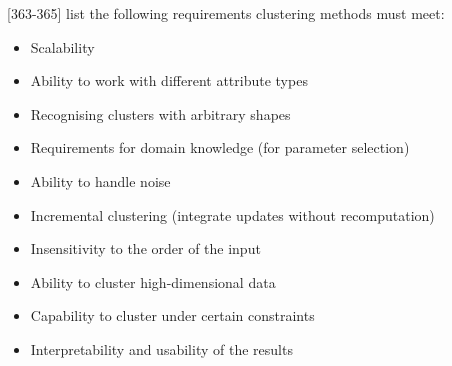 

\textcite{han2011data}[363-365] list the following requirements  clustering methods must meet:
\begin{itemize}
  \item Scalability
  \item Ability to work with different attribute types
  \item Recognising clusters with arbitrary shapes
  \item Requirements for domain knowledge (for parameter selection)
  \item Ability to handle noise
  \item Incremental clustering (integrate updates without recomputation)
  \item Insensitivity to the order of the input
  \item Ability to cluster high-dimensional data 
  \item Capability to cluster under certain constraints
  \item Interpretability and usability of the results
\end{itemize}
